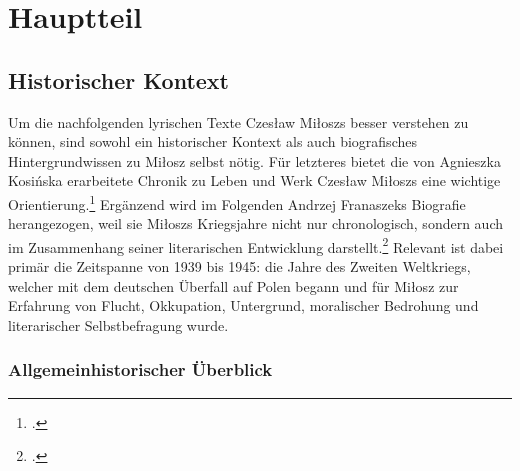 
\section{Hauptteil}
\noindent
\onehalfspacing%
\justifying%

\subsection{Historischer Kontext}

Um die nachfolgenden lyrischen Texte Czesław Miłoszs besser verstehen zu können, sind sowohl ein historischer Kontext als auch biografisches Hintergrundwissen zu Miłosz selbst nötig. Für letzteres bietet die von Agnieszka Kosińska erarbeitete Chronik zu Leben und Werk Czesław Miłoszs eine wichtige Orientierung.\footcite{kosinska-2025} Ergänzend wird im Folgenden Andrzej Franaszeks Biografie herangezogen, weil sie Miłoszs Kriegsjahre nicht nur chronologisch, sondern auch im Zusammenhang seiner literarischen Entwicklung darstellt.\footcite[vgl.][179–225]{franaszek-2017} Relevant ist dabei primär die Zeitspanne von 1939 bis 1945: die Jahre des Zweiten Weltkriegs, welcher mit dem deutschen Überfall auf Polen begann und für Miłosz zur Erfahrung von Flucht, Okkupation, Untergrund, moralischer Bedrohung und literarischer Selbstbefragung wurde.

\subsubsection{Allgemeinhistorischer Überblick}

